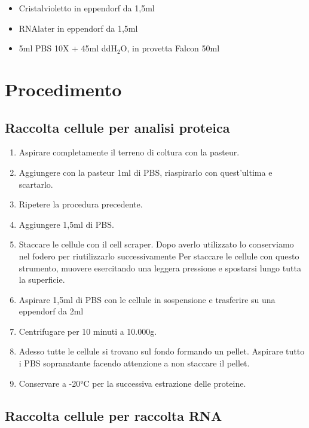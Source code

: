 \begin{itemize}
\item Cristalvioletto in eppendorf da 1,5ml
\item RNAlater in eppendorf da 1,5ml
\item 5ml PBS 10X + 45ml ddH$_2$O, in provetta Falcon 50ml
\end{itemize}

\section{Procedimento}

\subsection{Raccolta cellule per analisi proteica}

\begin{enumerate}

\item Aspirare completamente il terreno di coltura con la pasteur.
\item Aggiungere con la pasteur 1ml di PBS, riaspirarlo con quest'ultima e scartarlo.
\item Ripetere la procedura precedente.
\item Aggiungere 1,5ml di PBS.
\item Staccare le cellule con il cell scraper.
Dopo averlo utilizzato lo conserviamo nel fodero per riutilizzarlo successivamente
Per staccare le cellule con questo strumento, muovere esercitando una leggera pressione
e spostarsi lungo tutta la superficie.
\item Aspirare 1,5ml di PBS con le cellule in sospensione e trasferire su una eppendorf da 2ml
\item Centrifugare per 10 minuti a 10.000g.
\item Adesso tutte le cellule si trovano sul fondo formando un pellet. Aspirare tutto
i PBS sopranatante facendo attenzione a non staccare il pellet.
\item Conservare a -20°C per la successiva estrazione delle proteine.

\end{enumerate}

\subsection{Raccolta cellule per raccolta RNA}

